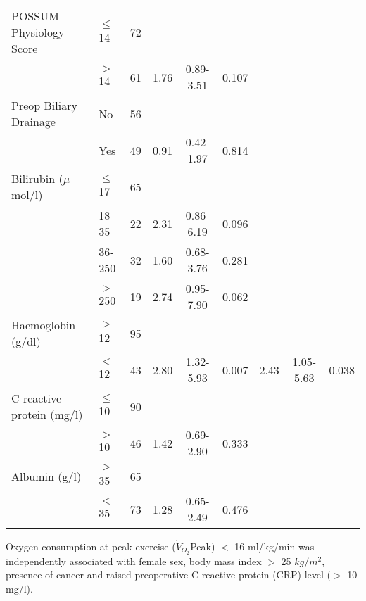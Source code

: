 \begin{sidewaystable}[p]
\begin{tabular}{|l l c| c c c| c c c|}
		POSSUM Physiology Score    & $\leq$ 14 & 72  &      &           &            &      &           &  \\
		                           & $>$ 14    & 61  & 1.76 & 0.89-3.51 & 0.107      &      &           &  \\
		Preop Biliary Drainage     & No        & 56  &      &           &            &      &           &  \\
		                           & Yes       & 49  & 0.91 & 0.42-1.97 & 0.814      &      &           &  \\
		Bilirubin ($\mu$mol/l)     & $\leq$ 17 & 65  &      &           &            &      &           &  \\
		                           & 18-35     & 22  & 2.31 & 0.86-6.19 & 0.096      &      &           &  \\
		                           & 36-250    & 32  & 1.60 & 0.68-3.76 & 0.281      &      &           &  \\
		                           & $>$ 250   & 19  & 2.74 & 0.95-7.90 & 0.062      &      &           &  \\
		Haemoglobin (g/dl)         & $\geq$ 12 & 95  &      &           &            &      &           &  \\
		                           & $<$ 12    & 43  & 2.80 & 1.32-5.93 & 0.007      & 2.43 & 1.05-5.63 & 0.038      \\
		C-reactive protein (mg/l)  & $\leq$ 10 & 90  &      &           &            &      &           &  \\
		                           & $>$ 10    & 46  & 1.42 & 0.69-2.90 & 0.333      &      &           &  \\
		Albumin (g/l)              & $\geq$ 35 & 65  &      &           &            &      &           &  \\
		                           & $<$ 35    & 73  & 1.28 & 0.65-2.49 & 0.476      &      &           &  \\ \hline
	\end{tabular}
	\medskip
	\begin{flushleft}
		Oxygen consumption at peak exercise ($\dot{V}_{O_2}$Peak) $<$ 16 ml/kg/min was independently associated with female sex, body mass index $>$ 25 $kg/m^2$, presence of cancer and raised preoperative C-reactive protein (CRP) level ($>$ 10 mg/l).
	\end{flushleft}
\end{sidewaystable}